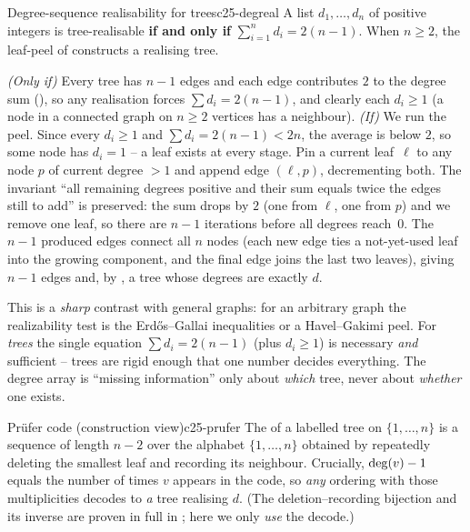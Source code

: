 \begin{theorem}{Degree-sequence realisability for trees}{c25-degreal}
A list $d_1,\dots,d_n$ of positive integers is tree-realisable \textbf{if and only if}
$\displaystyle\sum_{i=1}^{n} d_i = 2(n-1)$. When $n\ge2$, the leaf-peel of 
constructs a realising tree.
\end{theorem}
\begin{proofbox}
\emph{(Only if)} Every tree has $n-1$ edges and each edge contributes $2$ to the degree sum
(), so any realisation forces $\sum d_i=2(n-1)$, and clearly each $d_i\ge1$
(a node in a connected graph on $n\ge2$ vertices has a neighbour).
\emph{(If)} We run the peel. Since every $d_i\ge1$ and $\sum d_i=2(n-1)<2n$, the average is below
$2$, so some node has $d_i=1$ -- a leaf exists at every stage. Pin a current leaf~$\ell$ to any node
$p$ of current degree $>1$ and append edge $(\ell,p)$, decrementing both. The invariant ``all
remaining degrees positive and their sum equals twice the edges still to add'' is preserved: the sum
drops by $2$ (one from $\ell$, one from $p$) and we remove one leaf, so there are $n-1$ iterations
before all degrees reach~$0$. The $n-1$ produced edges connect all $n$ nodes (each new edge ties a
not-yet-used leaf into the growing component, and the final edge joins the last two leaves), giving
$n-1$ edges and, by , a tree whose degrees are exactly $d$. \end{proofbox}
\begin{insightbox}
This is a \emph{sharp} contrast with general graphs: for an arbitrary graph the realizability test
is the Erd\H{o}s--Gallai inequalities or a Havel--Gakimi peel. For \emph{trees} the single equation
$\sum d_i=2(n-1)$ (plus $d_i\ge1$) is necessary \emph{and} sufficient -- trees are rigid enough that
one number decides everything. The degree array is ``missing information'' only about \emph{which}
tree, never about \emph{whether} one exists.
\end{insightbox}

\begin{definition}{Pr\"ufer code (construction view)}{c25-prufer}
The  of a labelled tree on $\{1,\dots,n\}$ is a sequence of length $n-2$ over
the alphabet $\{1,\dots,n\}$ obtained by repeatedly deleting the smallest leaf and recording its
neighbour. Crucially, $\operatorname{deg}(v)-1$ equals the number of times $v$ appears in the code, so
\emph{any} ordering with those multiplicities decodes to \emph{a} tree realising $d$. (The
deletion--recording bijection and its inverse are proven in full in ; here we only
\emph{use} the decode.)
\end{definition}

